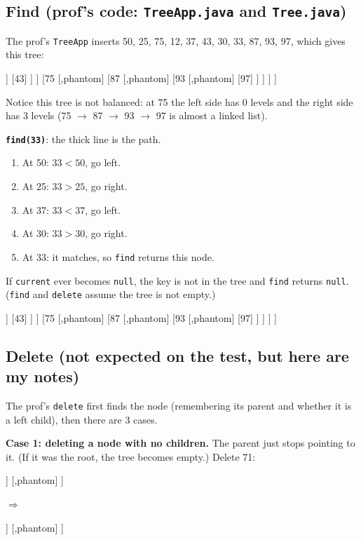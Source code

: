 \documentclass[11pt]{article}
\begin{document}
	\subsection{Find (prof's code: \texttt{TreeApp.java} and \texttt{Tree.java})}
	The prof's \texttt{TreeApp} inserts 50, 25, 75, 12, 37, 43, 30, 33, 87, 93, 97, which gives this tree:
	\begin{center}
		\begin{forest}
			[50
			[25
			[12]
			[37
			[30
			[,phantom]
			[33]
			]
			[43]
			]
			]
			[75
			[,phantom]
			[87
			[,phantom]
			[93
			[,phantom]
			[97]
			]
			]
			]
			]
		\end{forest}
	\end{center}
	Notice this tree is not balanced: at 75 the left side has 0 levels and the right side has 3 levels (75 $\to$ 87 $\to$ 93 $\to$ 97 is almost a linked list).
	
	\textbf{\texttt{find(33)}}: the thick line is the path.
	\begin{enumerate}
		\item At 50: $33<50$, go left.
		\item At 25: $33>25$, go right.
		\item At 37: $33<37$, go left.
		\item At 30: $33>30$, go right.
		\item At 33: it matches, so \texttt{find} returns this node.
	\end{enumerate}
	If \texttt{current} ever becomes \texttt{null}, the key is not in the tree and \texttt{find} returns \texttt{null}. (\texttt{find} and \texttt{delete} assume the tree is not empty.)
	\begin{center}
		\begin{forest}
			[50
			[25, onpath
			[12]
			[37, onpath
			[30, onpath
			[,phantom]
			[33, onpath]
			]
			[43]
			]
			]
			[75
			[,phantom]
			[87
			[,phantom]
			[93
			[,phantom]
			[97]
			]
			]
			]
			]
		\end{forest}
	\end{center}
	
	\subsection{Delete (not expected on the test, but here are my notes)}
	The prof's \texttt{delete} first finds the node (remembering its parent and whether it is a left child), then there are 3 cases.
	
	\textbf{Case 1: deleting a node with no children.} The parent just stops pointing to it. (If it was the root, the tree becomes empty.) Delete 71:
	\begin{center}
		\begin{forest}
			[80
			[52
			[48]
			[71, onpath]
			]
			[,phantom]
			]
		\end{forest}
		\quad$\Rightarrow$\quad
		\begin{forest}
			[80
			[52
			[48]
			[,phantom]
			]
			[,phantom]
			]
		\end{forest}
	\end{center}
	
\end{document}
